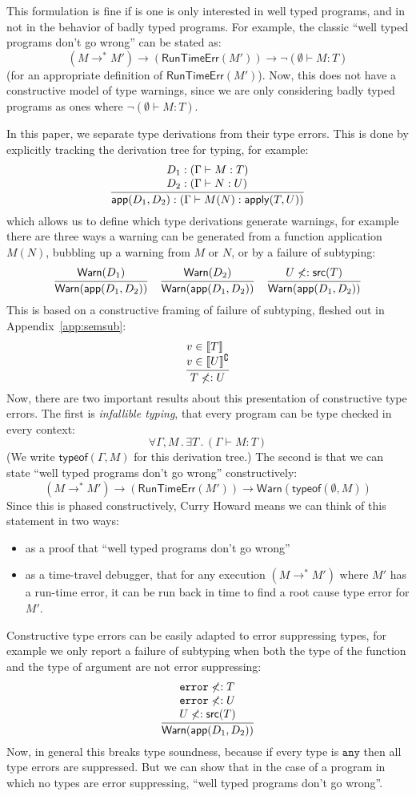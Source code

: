 \documentclass[acmsmall,review,screen]{acmart}
\makeatletter
\newcommand{\infer}[2]{\frac{\displaystyle\begin{array}{@{}l@{}}#1\end{array}}{\displaystyle#2}}
\newcommand{\ANY}{\mathtt{any}}
\newcommand{\ERROR}{\mathtt{error}}
\newcommand{\WARN}{\mathsf{Warn}}
\newcommand{\RUNTIMEERR}{\mathsf{RunTimeErr}}
\newcommand{\APPLY}{\mathsf{apply}}
\newcommand{\APP}{\mathsf{app}}
\newcommand{\SRC}{\mathsf{src}}
\newcommand{\TYPEOF}{\mathsf{typeof}}
\newcommand{\fun}{\mathbin{\rightarrow}}
\newcommand{\sem}[1]{\llbracket{#1}\rrbracket}
\newcommand{\nsem}[1]{\llbracket{#1}\rrbracket^\complement}
\newcommand{\st}{\mathbin.}
\makeatother
\begin{document}
This formulation is fine if is one is only interested in well typed programs,
and in not in the behavior of badly typed programs. For example,
the classic ``well typed programs don't go wrong'' can be stated as:
\[
  (M \rightarrow^* M') \fun
  (\RUNTIMEERR(M')) \fun
  \neg(\emptyset \vdash M : T)
\]
(for an appropriate definition of $\RUNTIMEERR(M')$). Now, this does not have
a constructive model of type warnings, since we are only considering
badly typed programs as ones where $\neg(\emptyset \vdash M : T)$.

In this paper, we separate type derivations from their type errors.
This is done by explicitly tracking the derivation tree for typing,
for example:
\[
  \infer{
    D_1 : (\Gamma \vdash M : T) \\
    D_2 : (\Gamma \vdash N : U)
  }{
    \APP(D_1, D_2) : (\Gamma \vdash M(N) : \APPLY(T,U))
  }
\]
which allows us to define which type derivations generate warnings,
for example there are three ways a warning can be generated from a
function application $M(N)$, bubbling up a warning from $M$ or $N$, or
by a failure of subtyping:
\[
  \infer{
    \WARN(D_1)
  }{
    \WARN(\APP(D_1, D_2))
  }
\quad
  \infer{
    \WARN(D_2)
  }{
    \WARN(\APP(D_1, D_2))
  }
\quad
  \infer{
    U \not<: \SRC(T)
  }{
    \WARN(\APP(D_1, D_2))
  }
\]
This is based on a constructive framing of failure of subtyping,
fleshed out in Appendix~\ref{app:semsub}:
\[
\infer{
    v \in \sem{T} \\
    v \in \nsem{U} \\
  }{
    T \not<: U
  }
\]
Now, there are two important results about this presentation of
constructive type errors. The first is \emph{infallible typing},
that every program can be type checked in every context:
\[
  \forall \Gamma, M \st
  \exists T \st
  (\Gamma \vdash M : T)
\]
(We write $\TYPEOF(\Gamma, M)$ for this derivation tree.)
The second is that we can state ``well typed programs don't go wrong''
constructively:
\[
  (M \rightarrow^* M') \fun
  (\RUNTIMEERR(M')) \fun
  \WARN(\TYPEOF(\emptyset, M))
\]
Since this is phased constructively,
Curry Howard means we can think of this statement in two ways:
\begin{itemize}
  \item as a proof that ``well typed programs don't go wrong''
  \item as a time-travel debugger,
    that for any execution $(M \rightarrow^* M')$
    where $M'$ has a run-time error,
    it can be run back in time to find a root cause type error for $M'$.
\end{itemize}
Constructive type errors can be easily adapted to error suppressing
types, for example we only report a failure of subtyping when both the
type of the function and the type of argument are not error suppressing:
\[
\infer{
    \ERROR \not<: T \\
    \ERROR \not<: U \\
    U \not<: \SRC(T)
  }{
    \WARN(\APP(D_1, D_2))
  }
\]
Now, in general this breaks type soundness, because if every type is
$\ANY$ then all type errors are suppressed. But we can show that in
the case of a program in which no types are error suppressing,
``well typed programs don't go wrong''.
\end{document}
